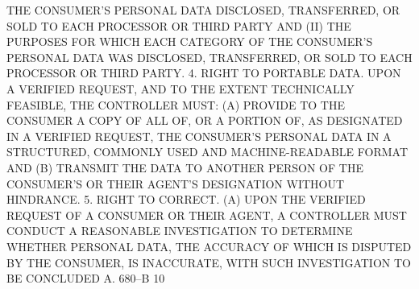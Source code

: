  THE CONSUMER'S PERSONAL DATA DISCLOSED, TRANSFERRED,  OR  SOLD  TO  EACH
 PROCESSOR  OR  THIRD PARTY AND (II) THE PURPOSES FOR WHICH EACH CATEGORY
 OF THE CONSUMER'S PERSONAL DATA WAS DISCLOSED, TRANSFERRED, OR  SOLD  TO
 EACH PROCESSOR OR THIRD PARTY.
   4. RIGHT TO PORTABLE DATA.  UPON A VERIFIED REQUEST, AND TO THE EXTENT
 TECHNICALLY FEASIBLE, THE CONTROLLER MUST: (A) PROVIDE TO THE CONSUMER A
 COPY  OF  ALL  OF, OR A PORTION OF, AS DESIGNATED IN A VERIFIED REQUEST,
 THE  CONSUMER'S  PERSONAL  DATA  IN  A  STRUCTURED,  COMMONLY  USED  AND
 MACHINE-READABLE  FORMAT  AND (B) TRANSMIT THE DATA TO ANOTHER PERSON OF
 THE CONSUMER'S OR THEIR AGENT'S DESIGNATION WITHOUT HINDRANCE.
   5. RIGHT TO CORRECT. (A) UPON THE VERIFIED REQUEST OF  A  CONSUMER  OR
 THEIR  AGENT,  A  CONTROLLER  MUST CONDUCT A REASONABLE INVESTIGATION TO
 DETERMINE WHETHER PERSONAL DATA, THE ACCURACY OF WHICH  IS  DISPUTED  BY
 THE  CONSUMER,  IS  INACCURATE,  WITH SUCH INVESTIGATION TO BE CONCLUDED
 A. 680--B                          10
 
